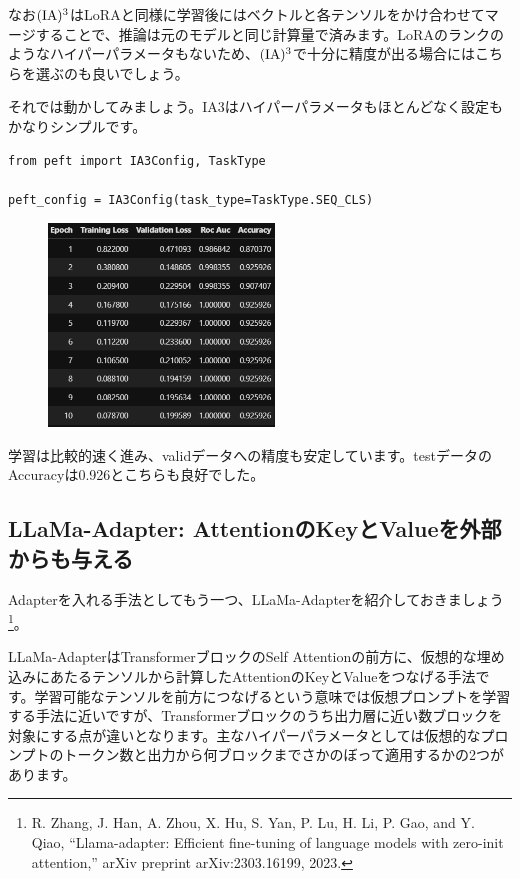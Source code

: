 \documentclass[a5paper,twoside,dvipdfmx]{jsarticle}
\begin{document}
なお$\rm{(IA)^3}$はLoRAと同様に学習後にはベクトルと各テンソルをかけ合わせてマージすることで、推論は元のモデルと同じ計算量で済みます。LoRAのランクのようなハイパーパラメータもないため、$\rm{(IA)^3}$で十分に精度が出る場合にはこちらを選ぶのも良いでしょう。

それでは動かしてみましょう。IA3はハイパーパラメータもほとんどなく設定もかなりシンプルです。

\begin{lstlisting}
from peft import IA3Config, TaskType
 
peft_config = IA3Config(task_type=TaskType.SEQ_CLS)
\end{lstlisting}


\newpage

\begin{figure}[h]
  \centering
  \includegraphics[width=60mm]{../C105Fig/gray/ia3_train.png}
 \end{figure} 

 
学習は比較的速く進み、validデータへの精度も安定しています。testデータのAccuracyは0.926とこちらも良好でした。


\subsection{LLaMa-Adapter: AttentionのKeyとValueを外部からも与える}

Adapterを入れる手法としてもう一つ、LLaMa-Adapterを紹介しておきましょう\footnote{R. Zhang, J. Han, A. Zhou, X. Hu, S. Yan, P. Lu, H. Li, P. Gao, and Y. Qiao, “Llama-adapter: Efficient fine-tuning of language models with zero-init attention,” arXiv preprint arXiv:2303.16199, 2023.}。

\newpage

LLaMa-AdapterはTransformerブロックのSelf Attentionの前方に、仮想的な埋め込みにあたるテンソルから計算したAttentionのKeyとValueをつなげる手法です。学習可能なテンソルを前方につなげるという意味では仮想プロンプトを学習する手法に近いですが、Transformerブロックのうち出力層に近い数ブロックを対象にする点が違いとなります。主なハイパーパラメータとしては仮想的なプロンプトのトークン数と出力から何ブロックまでさかのぼって適用するかの2つがあります。
\end{document}
